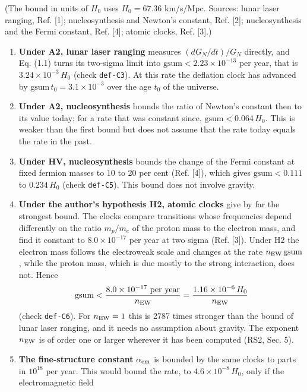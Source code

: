 \documentclass[
  10pt,
]{article}
\providecommand{\tightlist}{%
  \setlength{\itemsep}{0pt}\setlength{\parskip}{0pt}}
\begin{document}
(The bound in units of \(H_0\) uses \(H_0=67.36\) km/s/Mpc. Sources:
lunar laser ranging, Ref. {[}1{]}; nucleosynthesis and Newton's
constant, Ref. {[}2{]}; nucleosynthesis and the Fermi constant, Ref.
{[}4{]}; atomic clocks, Ref. {[}3{]}.)

\begin{enumerate}
\def\labelenumi{\arabic{enumi}.}
\tightlist
\item
  \textbf{Under A2, lunar laser ranging} measures \((dG_N/dt)/G_N\)
  directly, and Eq. (1.1) turns its two-sigma limit into
  \(\mathrm{gsum}<2.23\times10^{-13}\) per year, that is
  \(3.24\times10^{-3}\,H_0\) (check \texttt{def-C3}). At this rate the
  deflation clock has advanced by
  \(\mathrm{gsum}\,t_0=3.1\times10^{-3}\) over the age \(t_0\) of the
  universe.
\item
  \textbf{Under A2, nucleosynthesis} bounds the ratio of Newton's
  constant then to its value today; for a rate that was constant since,
  \(\mathrm{gsum}<0.064\,H_0\). This is weaker than the first bound but
  does not assume that the rate today equals the rate in the past.
\item
  \textbf{Under HV, nucleosynthesis} bounds the change of the Fermi
  constant at fixed fermion masses to 10 to 20 per cent (Ref. {[}4{]}),
  which gives \(\mathrm{gsum}<0.111\) to \(0.234\,H_0\) (check
  \texttt{def-C5}). This bound does not involve gravity.
\item
  \textbf{Under the author's hypothesis H2, atomic clocks} give by far
  the strongest bound. The clocks compare transitions whose frequencies
  depend differently on the ratio \(m_p/m_e\) of the proton mass to the
  electron mass, and find it constant to \(8.0\times10^{-17}\) per year
  at two sigma (Ref. {[}3{]}). Under H2 the electron mass follows the
  electroweak scale and changes at the rate
  \(n_{\rm EW}\,\mathrm{gsum}\), while the proton mass, which is due
  mostly to the strong interaction, does not. Hence
  \[\mathrm{gsum}<\frac{8.0\times10^{-17}\ \text{per year}}{n_{\rm EW}}=\frac{1.16\times10^{-6}\,H_0}{n_{\rm EW}}\]
  (check \texttt{def-C6}). For \(n_{\rm EW}=1\) this is 2787 times
  stronger than the bound of lunar laser ranging, and it needs no
  assumption about gravity. The exponent \(n_{\rm EW}\) is of order one
  or larger wherever it has been computed (RS2, Sec. 5).
\item
  \textbf{The fine-structure constant} \(\alpha_{\rm em}\) is bounded by
  the same clocks to parts in \(10^{18}\) per year. This would bound the
  rate, to \(4.6\times10^{-8}\,H_0\), only if the electromagnetic field

\end{enumerate}
\end{document}
